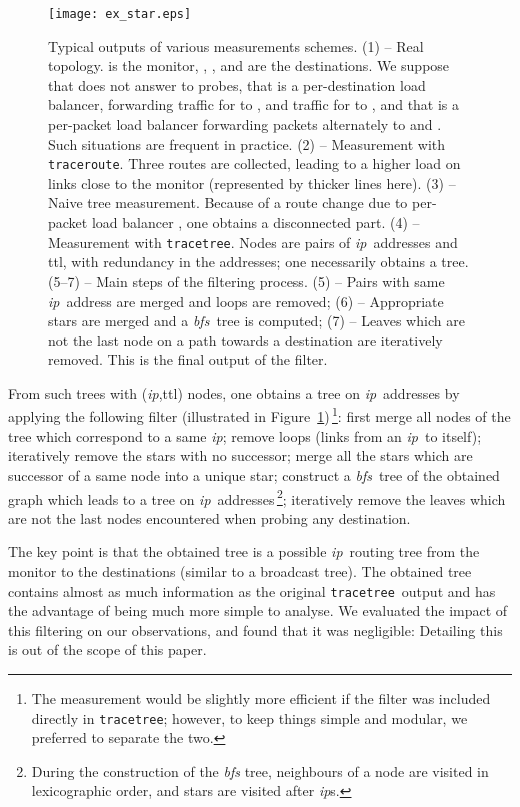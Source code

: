 \documentclass[times, 10pt,twocolumn]{article}
\newcommand{\traceroute}{{\tt trace\-route}}
\newcommand{\tracetree}{{\tt trace\-tree}}
\newcommand{\ip}{\mbox{\em \sc ip}}
\newcommand{\bfs}{{\em \sc bfs}}
\newcommand{\ttl}{\mbox{\sc ttl}}
\begin{document}
 
\begin{figure}[!h]
\centering
\texttt{[image: ex\_star.eps]}
\caption{Typical outputs of various measurements schemes.
(1) -- Real topology.  is the monitor, , , and  are the destinations.
We suppose that  does not answer to probes, that  is a per-destination load balancer,
forwarding traffic for  to ,
and traffic for  to , and that  is a per-packet load balancer forwarding packets alternately to  and . Such situations are frequent in practice.
(2) -- Measurement with \traceroute. Three routes are collected, leading to a higher load on links close to the monitor (represented by thicker lines here).
(3) -- Naive tree measurement. Because of a route change due to per-packet load balancer , one obtains a disconnected part.
(4) -- Measurement with \tracetree. Nodes are pairs of \ip\ addresses and \ttl, with redundancy in the addresses;
one necessarily obtains a tree.
(5--7) -- Main steps of the filtering process.
(5) -- Pairs with same \ip\ address are merged and loops are removed;
(6) -- Appropriate stars are merged and a \bfs\ tree is computed;
(7) -- Leaves which are not the last node on a path towards a destination are iteratively removed.
This is the final output of the filter.
}
\label{fig_ex}
\end{figure}

From such trees with (\ip,\ttl) nodes, one obtains a tree on \ip\ addresses by applying the following filter (illustrated in Figure~\ref{fig_ex})\,\footnote{The measurement would be slightly more efficient if the filter was included directly in \tracetree; however, to keep things simple and modular, we preferred to separate the two.}:
first merge all nodes of the tree which correspond to a same \ip;
remove loops (links from an \ip\ to itself); iteratively remove the stars with no successor;
merge all the stars which are successor of a same node into a unique star;
construct a \bfs\ tree of the obtained graph which leads to a tree on \ip\ addresses\,\footnote{During the construction
of the \bfs{} tree, neighbours of a node are visited in lexicographic order, and stars 
are visited after \ip{}s.};
iteratively remove the leaves which are not the last nodes encountered when probing any destination.

The key point is that the obtained tree is a possible \ip\ routing
tree from the monitor to the destinations (similar to a broadcast
tree).
The obtained tree contains almost as much information as the original
\tracetree\ output and has the advantage of being much more simple to
analyse.
We evaluated the impact of this filtering on our observations,
and found that it was negligible:
Detailing this is out of the scope of this paper.
\end{document}
